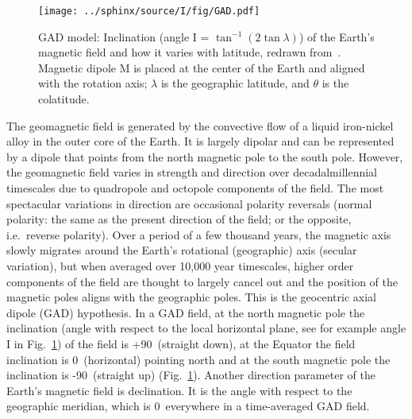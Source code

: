 \begin{figure}[!ht]
  \centering
    \texttt{[image: ../sphinx/source/I/fig/GAD.pdf]}
  \captionsetup{width=.95\textwidth}
  \caption[Geocentric axial dipole model]{GAD model: Inclination (angle I =
    $\tan^{-1}(2\tan\lambda)$) of the Earth's magnetic field and how it varies
    with latitude, redrawn from~\citet{B92,T08,T20}. Magnetic dipole M is placed
    at the center of the Earth and aligned with the rotation axis; $\lambda$ is
    the geographic latitude, and $\theta$ is the
    colatitude.}\label{Fig:chap_intro_gad}
\end{figure}

The geomagnetic field is generated by the convective flow of a liquid
iron-nickel alloy in the outer core of the Earth. It is largely dipolar and can
be represented by a dipole that points from the north magnetic pole to the south
pole. However, the geomagnetic field varies in strength and direction over
decadal\textendash{}millennial timescales due to quadropole and octopole
components of the field. The most spectacular variations in direction are
occasional polarity reversals (normal polarity: the same as the present
direction of the field; or the opposite, i.e.\ reverse polarity). Over a period
of a few thousand years, the magnetic axis slowly migrates around the Earth's
rotational (geographic) axis (secular variation), but when averaged over 10,000
year timescales, higher order components of the field are thought to largely
cancel out and the position of the magnetic poles aligns with the geographic
poles. This is the geocentric axial dipole (GAD) hypothesis. In a GAD field, at
the north magnetic pole the inclination (angle with respect to the local
horizontal plane, see for example angle I in Fig.~\ref{Fig:chap_intro_gad}) of
the field is +90\degree\ (straight down), at the Equator the field inclination
is 0\degree\ (horizontal) pointing north and at the south magnetic pole the
inclination is -90\degree\ (straight up) (Fig.~\ref{Fig:chap_intro_gad}).
Another direction parameter of the Earth's magnetic field is declination. It is
the angle with respect to the geographic meridian, which is 0\degree\ everywhere
in a time-averaged GAD field.

